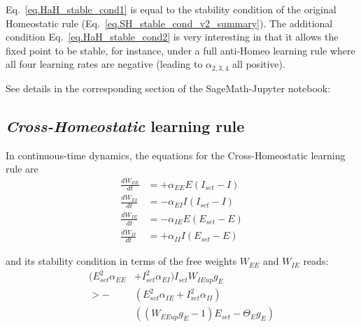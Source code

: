 \documentclass[twocolumn]{article}
\newcommand{\EE}{\mathit{EE}}
\newcommand{\EI}{\mathit{EI}}
\newcommand{\IE}{\mathit{IE}}
\newcommand{\II}{\mathit{II}}
\newcommand{\set}{\mathit{set}}
\newcommand{\up}{\mathit{up}}
\begin{document}
\noindent Eq.\ \ref{eq.HaH_stable_cond1} is equal to the stability condition of the original Homeostatic rule (Eq.\ \ref{eq.SH_stable_cond_v2_summary}). The additional condition Eq.\ \ref{eq.HaH_stable_cond2} is very interesting in that it allows the fixed point to be stable, for instance, under a full anti-Homeo learning rule where all four learning rates are negative (leading to $\alpha_{2,3,4}$ all positive).

See details in the corresponding section of the SageMath-Jupyter notebook:






\subsection{{\em Cross-Homeostatic} learning rule}

In continuous-time dynamics, the equations for the Cross-Homeostatic learning rule are
\begin{equation}
\begin{aligned}
\frac{dW_{\EE}}{dt} & = +\alpha_{\EE} E (I_{\set} - I) \\
\frac{dW_{\EI}}{dt} & = -\alpha_{\EI} I (I_{\set} - I) \\
\frac{dW_{\IE}}{dt} & = -\alpha_{\IE} E (E_{\set} - E) \\
\frac{dW_{\II}}{dt} & = +\alpha_{\II} I (E_{\set} - E)
\end{aligned}
\label{eq.CH_equation}
\end{equation}

\noindent and its stability condition in terms of the free weights $W_{\EE}$ and $W_{\IE}$ reads:
\begin{equation}
\begin{aligned}
(E_{\set}^2 \alpha_{\EE} & + I_{\set}^2 \alpha_{\EI}) I_{\set} W_{\IE\up} g_E \\
> - & 
(E_{\set}^2 \alpha_{\IE} + I_{\set}^2 \alpha_{\II}) \\
& ((W_{\EE\up} g_E - 1)E_{\set} - \Theta_E g_E)
\end{aligned}
\label{eq.CH_stable_cond_v1_summary}
\end{equation}
\end{document}
